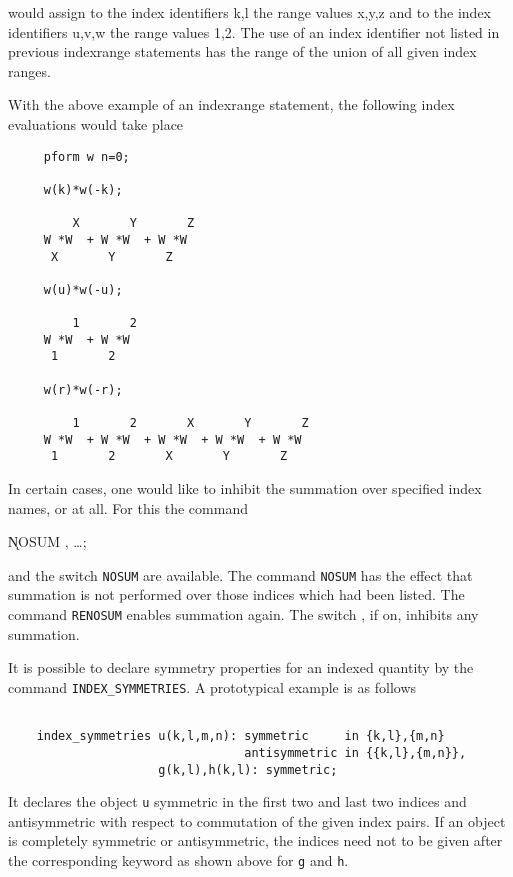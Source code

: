 would assign to the index identifiers k,l the range values x,y,z and
to the index identifiers u,v,w the range values 1,2. The use of an
index identifier not listed in previous indexrange statements has the
range of the union of all given index ranges.

With the above example of an indexrange statement, the following
index evaluations would take place

\begin{verbatim}
     pform w n=0;
    
     w(k)*w(-k);

         X       Y       Z
     W *W  + W *W  + W *W
      X       Y       Z

     w(u)*w(-u);

         1       2
     W *W  + W *W
      1       2

     w(r)*w(-r);

         1       2       X       Y       Z
     W *W  + W *W  + W *W  + W *W  + W *W
      1       2       X       Y       Z
\end{verbatim}

In certain cases, one would like to inhibit the summation over
specified index names, or at all.  For this the command

\hspace*{2em} \k{NOSUM} , \ldots;\label{NOSUM}

and the switch \texttt{NOSUM} are
available.  The command \texttt{NOSUM} has the effect that summation is
not performed over those indices which had been listed.  The command
{\tt RENOSUM}\label{RENOSUM} enables summation again.  The switch , 
if on, inhibits any summation. 

\label{INDEXSYMMETRIES} 
It is possible to declare symmetry properties for an indexed quantity by 
the command {\tt INDEX\_SYMMETRIES}. A prototypical example is as
follows

\begin{verbatim}

    index_symmetries u(k,l,m,n): symmetric     in {k,l},{m,n}
                                 antisymmetric in {{k,l},{m,n}},
                     g(k,l),h(k,l): symmetric;

\end{verbatim}

It declares the object {\tt u} symmetric in the first two and last 
two indices and antisymmetric with respect to commutation of the given
index pairs. If an object is completely symmetric or antisymmetric,
the indices need not to be given after the corresponding keyword as
shown above for {\tt g} and {\tt h}.

